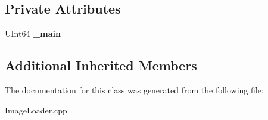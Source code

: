 \subsection*{Private Attributes}
\begin{DoxyCompactItemize}
\item 
\mbox{\label{class_image_loader___symbol___main_a494bb3eafd2f1a6ce9b5b46e5aaaa583}} 
U\+Int64 {\bfseries \+\_\+main}
\end{DoxyCompactItemize}
\subsection*{Additional Inherited Members}


The documentation for this class was generated from the following file\+:\begin{DoxyCompactItemize}
\item 
Image\+Loader.\+cpp\end{DoxyCompactItemize}
